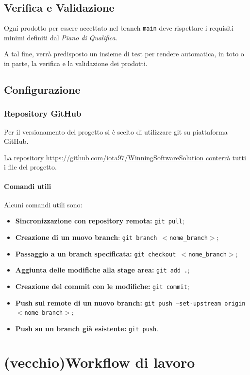 \documentclass[a4paper, 12pt]{article}
\begin{document}
\subsection{Verifica e Validazione}\label{verifica-e-validazione}
Ogni prodotto per essere accettato nel branch \texttt{main} deve rispettare i requisiti minimi definiti dal \textit{Piano di Qualifica}.

A tal fine, verrà predisposto un insieme di test per rendere automatica, in toto o in parte, la verifica e la validazione dei prodotti.

\subsection{Configurazione}

\subsubsection{Repository GitHub}\label{configurazione-github}
Per il versionamento del progetto si è scelto di utilizzare git su piattaforma GitHub.

La repository \url{https://github.com/iota97/WinningSoftwareSolution} conterrà tutti i file del progetto.

\paragraph{Comandi utili}
Alcuni comandi utili sono:
\begin{itemize}
\item \textbf{Sincronizzazione con repository remota:} \texttt{git pull};
\item \textbf{Creazione di un nuovo branch}: \texttt{git branch $<$nome\_branch$>$};
\item \textbf{Passaggio a un branch specificata:} \texttt{git checkout $<$nome\_branch$>$};
\item \textbf{Aggiunta delle modifiche alla stage area:} \texttt{git add .};
\item \textbf{Creazione del commit con le modifiche:} \texttt{git commit};
\item \textbf{Push sul remote di un nuovo branch:} \texttt{git push --set-upstream origin $<$nome\_branch$>$};
\item \textbf{Push su un branch già esistente:} \texttt{git push}.
\end{itemize}

\section{(vecchio)Workflow di lavoro}
\end{document}
